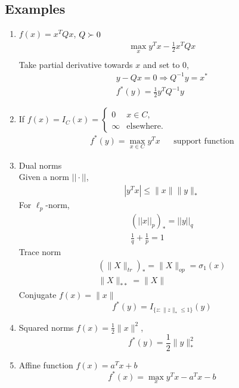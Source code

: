 \documentclass[10pt]{article}
\begin{document}
\subsection*{Examples}
\begin{enumerate}
\item $f(x) = x^T Q x$,  $Q \succ 0\\$
\begin{align*}
\max\limits_x y^T x - \frac{1}{2} x^T Q x\\
\end{align*}
Take partial derivative towards $x$ and set to 0,
\begin{align*}
y - Qx = 0 \Longrightarrow Q^{-1} y = x^*\\
f^*(y) = \frac{1}{2} y^T Q^{-1} y
\end{align*}
\item If $f(x) = I_C(x) = \left\{
\begin{array}{ll}
0 &x\in C,\\
\infty &\text{elsewhere.}
\end{array}
\right.$
\begin{align*}
f^*(y) = \max\limits_{x\in C} y^T x &&\text{support function}
\end{align*}
\item Dual norms\\
Given a norm $||\cdot||$,
\begin{align*}
|y^T x| \le \|x\| \|y\|_*
\end{align*}
For $\ell_p$-norm,
\begin{align*}
(||x||_p)_* = ||y||_q\\
\frac{1}{q} + \frac{1}{p} = 1
\end{align*}
Trace norm
\begin{align*}
(\|X\|_{tr})_* = \| X \|_{op} = \sigma_1(x)\\
\|X\|_{**} = \|X\|
\end{align*}
Conjugate $f(x) = \|x\|$
\begin{equation*}
f^*(y) = I_{\{z:\|z\|_*\le 1\}} (y)
\end{equation*}
\item Squared norms $f(x) = \frac{1}{2} \| x \| ^2$,
\begin{equation*}
f^*(y) = \frac{1}{2} \| y \|_*^2
\end{equation*}
\item Affine function
$f(x) = a^Tx + b$
\begin{equation*}
f^*(x) = \max\limits_x y^T x - a^T x - b
\end{equation*}

\end{enumerate}
\end{document}
